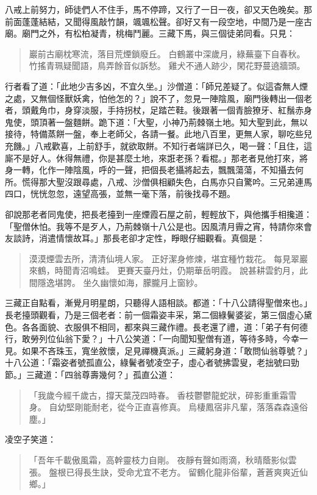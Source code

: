 八戒上前努力，師徒們人不住手，馬不停蹄，又行了一日一夜，卻又天色晚矣。那前面蓬蓬結結，又聞得風敲竹韻，颯颯松聲。卻好又有一段空地，中間乃是一座古廟。廟門之外，有松柏凝青，桃梅鬥麗。三藏下馬，與三個徒弟同看。只見：
\begin{quote}
巖前古廟枕寒流，落目荒煙鎖廢丘。
白鶴叢中深歲月，綠蕪臺下自春秋。
竹搖青珮疑聞語，鳥弄餘音似訴愁。
雞犬不通人跡少，閑花野蔓遶牆頭。
\end{quote}

行者看了道：「此地少吉多凶，不宜久坐。」沙僧道：「師兄差疑了。似這杳無人煙之處，又無個怪獸妖禽，怕他怎的？」說不了，忽見一陣陰風，廟門後轉出一個老者，頭戴角巾，身穿淡服，手持拐杖，足踏芒鞋。後跟著一個青臉獠牙、紅鬚赤身鬼使，頭頂著一盤麵餅。跪下道：「大聖，小神乃荊棘嶺土地。知大聖到此，無以接待，特備蒸餅一盤，奉上老師父，各請一餐。此地八百里，更無人家，聊吃些兒充饑。」八戒歡喜，上前舒手，就欲取餅。不知行者端詳已久，喝一聲：「且住，這廝不是好人。休得無禮，你是甚麼土地，來誑老孫？看棍。」那老者見他打來，將身一轉，化作一陣陰風，呼的一聲，把個長老攝將起去，飄飄蕩蕩，不知攝去何所。慌得那大聖沒跟尋處，八戒、沙僧俱相顧失色，白馬亦只自驚吟。三兄弟連馬四口，恍恍忽忽，遠望高張，並無一毫下落，前後找尋不題。

卻說那老者同鬼使，把長老擡到一座煙霞石屋之前，輕輕放下，與他攜手相攙道：「聖僧休怕。我等不是歹人，乃荊棘嶺十八公是也。因風清月霽之宵，特請你來會友談詩，消遣情懷故耳。」那長老卻才定性，睜眼仔細觀看。真個是：
\begin{quote}
漠漠煙雲去所，清清仙境人家。
正好潔身修煉，堪宜種竹栽花。
每見翠巖來鶴，時聞青沼鳴蛙。
更賽天臺丹灶，仍期華岳明霞。
說甚耕雲釣月，此間隱逸堪誇。
坐久幽懷如海，朦朧月上窗紗。
\end{quote}

三藏正自點看，漸覺月明星朗，只聽得人語相談。都道：「十八公請得聖僧來也。」長老擡頭觀看，乃是三個老者：前一個霜姿丰采，第二個綠鬢婆娑，第三個虛心黛色。各各面貌、衣服俱不相同，都來與三藏作禮。長老還了禮，道：「弟子有何德行，敢勞列位仙翁下愛？」十八公笑道：「一向聞知聖僧有道，等待多時，今幸一見。如果不吝珠玉，寬坐敘懷，足見禪機真派。」三藏躬身道：「敢問仙翁尊號？」十八公道：「霜姿者號孤直公，綠鬢者號凌空子，虛心者號拂雲叟，老拙號曰勁節。」三藏道：「四翁尊壽幾何？」孤直公道：
\begin{quote}
「我歲今經千歲古，撐天葉茂四時春。
香枝鬱鬱龍蛇狀，碎影重重霜雪身。
自幼堅剛能耐老，從今正直喜修真。
烏棲鳳宿非凡輩，落落森森遠俗塵。」
\end{quote}

凌空子笑道：
\begin{quote}
「吾年千載傲風霜，高幹靈枝力自剛。
夜靜有聲如雨滴，秋晴蔭影似雲張。
盤根已得長生訣，受命尤宜不老方。
留鶴化龍非俗輩，蒼蒼爽爽近仙鄉。」
\end{quote}

